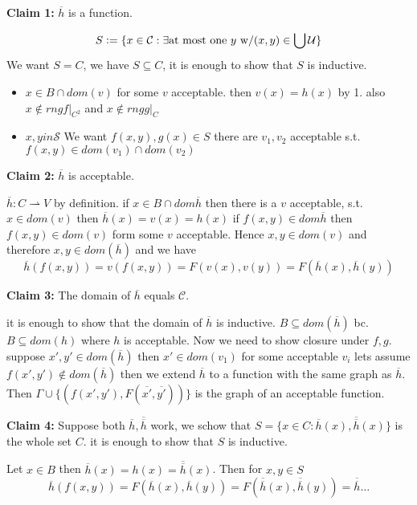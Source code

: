 \textbf{Claim 1:} $\overline{h}$ is a function.
\begin{claimproof}
    $$S\vcentcolon= \{x\in \mathcal{C} : \exists \text{at most one $y$ w/} (x,y)\in \bigcup \mathcal{U}\}$$
    We want $S = C$, we have $S\subseteq C$,
    it is enough to show that $S$ is inductive.
    \begin{itemize}
        \item $x\in B\cap dom(v)$ for some $v$ acceptable.
        then $v(x) = h(x)$ by 1.
        also $x\notin rng f|_{C^2}$ and $x\notin rng g|_C$
        \item $x,y in \mathcal{S}$
        We want $f(x,y),g(x)\in S$
        there are $v_1,v_2$ acceptable s.t. $f(x,y)\in dom(v_1)\cap dom(v_2)$
    \end{itemize}
\end{claimproof}
\textbf{Claim 2:} $\overline{h}$ is acceptable.
\begin{claimproof}
    $\overline{h}: C \rightharpoonup V$ by definition.
    if $x\in B\cap dom \overline{h}$ then there is a $v$ acceptable, s.t. $x\in dom(v)$
    then $\overline{h}(x) = v(x)=h(x)$
    if $f(x,y)\in dom \overline{h}$ then $f(x,y)\in dom (v)$ form some $v$ acceptable.
    Hence $x,y\in dom(v)$ and therefore $x,y\in dom (\overline{h})$
    and we have $$\overline{h}(f(x,y)) = v(f(x,y)) = F(v(x),v(y)) = F(\overline{h}(x),\overline{h}(y))$$
\end{claimproof}
\textbf{Claim 3:} The domain of $\overline{h}$ equals $\mathcal{C}$. 
\begin{claimproof}
    it is enough to show that the domain of $\overline{h}$ is inductive. 
    $B\subseteq dom (\overline{h})$ bc. $B\subseteq dom (h)$ where $h$ is acceptable.
    Now we need to show closure under $f,g$. suppose $x',y'\in dom (\overline{h})$ then $x'\in dom (v_1)$ 
    for some acceptable $v_i$ lets assume $f(x',y')\notin dom (\overline{h})$
    then we extend $\overline{h}$ to a function with the same graph as $\overline{h}$.
    Then
    $\varGamma \cup \{(f(x',y'),F(\overline{x'},\overline{y'}))\}$ 
    is the graph of an acceptable function.
\end{claimproof}
\textbf{Claim 4:} Suppose both $\overline{h},\overline{\overline{h}}$ work, we schow that $S=\{x\in C: \overline{h}(x),\overline{\overline{h}}(x)\}$ is the whole set $C$.
it is enough to show that $S$ is inductive.

Let $x\in B$ then $\overline{h}(x) = h(x) = \overline{\overline{h}}(x)$.
Then for $x,y\in S$ \[\overline{h}(f(x,y)) = F(\overline{h}(x),\overline{h}(y))=  F(\overline{\overline{h}}(x),\overline{\overline{h}}(y))=\overline{\overline{h}}\dots \]
